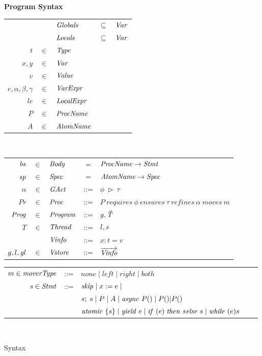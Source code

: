 

\begin{figure}
\setlength{\tabcolsep}{3pt}
{\bf Program Syntax} \\
\begin{tabular}{rclcl}
& & $\mathit{Globals}$ & $\subseteq$ &$\mathit{Var}$ \\
& & $\mathit{Locals}$ & $\subseteq$ & $\mathit{Var}$ \\
$t$ & $\in$ & $\mathit{Type}$ \\
$x,y$ & $\in$ & $\mathit{Var}$ \\
$v$ &  $\in$ & $\mathit{Value}$ \\
$e,\alpha,\beta,\gamma$ & $\in$ & $\mathit{VarExpr}$ \\
$\mathit{le}$ & $\in$ & $\mathit{LocalExpr}$ \\
$P$ & $\in$ & $\mathit{ProcName}$ \\
$A$ & $\in$ & $\mathit{AtomName}$ \\
\end{tabular}\\
\begin{tabular}{rclcl}
$\mathit{bs}$ & $\in$ & $\mathit{Body}$ & = & $\mathit{ProcName} \rightarrow \mathit{Stmt}$ \\
$\mathit{sp}$ & $\in$ & $\mathit{Spec}$ & = & $\mathit{AtomName} \rightarrow \mathit{Spec}$ \\
$\alpha$ & $\in$ & $\mathit{GAct}$ & ::= & $\phi\ \rhd\ \tau$ \\ %
$Pr$ & $\in$ & $\mathit{Proc}$ &::= & $P\ \mathit{requires}\ \phi\
\mathit{ensures}\ \tau\ \mathit{refines}\ \alpha\ \mathit{moves}\ m$ \\
$\mathit{Prog}$ & $\in$ & $\mathit{Program}$ & ::= & $g, \vec{\mathit{T}}$ \\
$T$ & $\in$ & $\mathit{Thread}$ & ::=  & $l, \mathit{s}$ \\
&&$\mathit{Vinfo}$ & ::= & $x:t=v$ \\
$g,l,\mathit{gl}$ & $\in$ & $\mathit{Vstore}$ & ::= & $\overrightarrow{\mathit{Vinfo}}$ \\
\end{tabular}
\begin{tabular}{rclcl}
$m \in \mathit{moverType}$ &::= &$\mathit{none} \mid \mathit{left} \mid \mathit{right} \mid \mathit{both}$ \\
$\mathit{s} \in \mathit{Stmt}$ &::= & $\mathit{skip} \mid x := e \mid$ \\
                  & & $s;\;s \mid P \mid A \mid \mathit{async}\ P() \mid P() | P()$ \\
                  & & $\mathit{atomic}\ \{s\} \mid \mathit{yield}\ e \mid {\mathit{if}\ (e)\;}{\mathit{then}\ {s}}{\mathit{else}\ {s}} \mid {\mathit{while}\ ({e}) {s}}$ \\ 
\end{tabular}\\
\setlength{\tabcolsep}{6pt}
\caption{Syntax}
\label{fig:syntax}
\end{figure}


